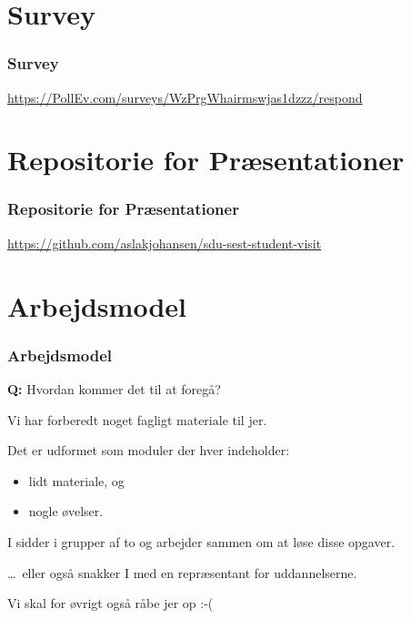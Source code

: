 \section{Survey}
\begin{frame}
    \frametitle{Survey}
    \begin{center}
    
      \vspace{4mm}
      \url{https://PollEv.com/surveys/WzPrgWhairmswjas1dzzz/respond}
    \end{center}
\end{frame}


\section{Repositorie for Præsentationer}
\begin{frame}
    \frametitle{Repositorie for Præsentationer}
    \begin{center}
      \url{https://github.com/aslakjohansen/sdu-sest-student-visit}
    \end{center}
\end{frame}

\section{Arbejdsmodel}
\begin{frame}
  \frametitle{Arbejdsmodel}
  \vspace{3mm}
  \textbf{Q:} Hvordan kommer det til at foregå?
  
  \pause
  \vspace{5mm}
  Vi har forberedt noget fagligt materiale til jer.
  
  \vspace{5mm}
  Det er udformet som moduler der hver indeholder:
  \begin{itemize}
    \item lidt materiale, og
    \item nogle øvelser.
  \end{itemize}
  
  \vspace{5mm}
  I sidder i grupper af to og arbejder sammen om at løse disse opgaver.
  
  \pause
  \vspace{5mm}
  \ldots\ eller også snakker I med en repræsentant for uddannelserne.
  
  \pause
  \vspace{5mm}
  Vi skal for øvrigt også råbe jer op :-(
\end{frame}

